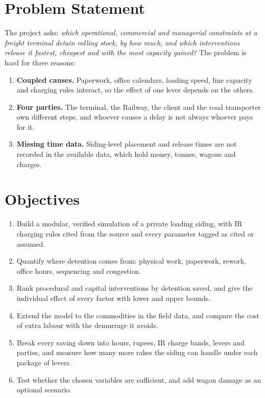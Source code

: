 \section{Problem Statement}
\label{sec:problem}
The project asks: \emph{which operational, commercial and managerial constraints at a freight terminal detain rolling stock, by how much, and which interventions release it fastest, cheapest and with the most capacity gained?} The problem is hard for three reasons:
\begin{enumerate}
    \item \textbf{Coupled causes.} Paperwork, office calendars, loading speed, line capacity and charging rules interact, so the effect of one lever depends on the others.
    \item \textbf{Four parties.} The terminal, the Railway, the client and the road transporter own different steps, and whoever causes a delay is not always whoever pays for it.
    \item \textbf{Missing time data.} Siding-level placement and release times are not recorded in the available data, which hold money, tonnes, wagons and charges.
\end{enumerate}

\section{Objectives}
\label{sec:objectives}
\begin{enumerate}
    \item Build a modular, verified simulation of a private loading siding, with IR charging rules cited from the source and every parameter tagged as cited or assumed.
    \item Quantify where detention comes from: physical work, paperwork, rework, office hours, sequencing and congestion.
    \item Rank procedural and capital interventions by detention saved, and give the individual effect of every factor with lower and upper bounds.
    \item Extend the model to the commodities in the field data, and compare the cost of extra labour with the demurrage it avoids.
    \item Break every saving down into hours, rupees, IR charge bands, levers and parties, and measure how many more rakes the siding can handle under each package of levers.
    \item Test whether the chosen variables are sufficient, and add wagon damage as an optional scenario.
\end{enumerate}

